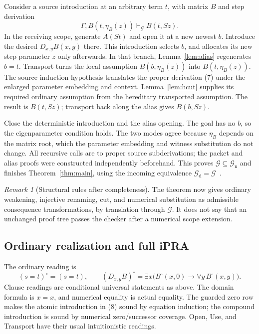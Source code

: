 \documentclass[11pt]{article}
\theoremstyle{definition}\newtheorem{definition}[theorem]{Definition}
\theoremstyle{remark}\newtheorem{remark}[theorem]{Remark}
\newcommand{\G}{\mathcal G}
\newcommand{\Gn}{\mathcal G_{\mathrm n}}
\newcommand{\Gd}{\mathcal G_{\mathrm d}}
\begin{document}
Consider a source introduction at an arbitrary term $t$, with matrix
$B$ and step derivation
\[
          \Gamma,B(t,\eta_B(z))\vdash_{\G}B(t,Sz).       \tag{7}
\]
In the receiving scope, generate $A(St)$ and open it at a new newest
$b$. Introduce the desired $D_{x,y}B(x,y)$ there. This introduction
selects $b$, and allocates its new step parameter $z$ only afterwards.
In that branch, Lemma~\ref{lem:alias} regenerates $b=t$. Transport
turns the local assumption $B(b,\eta_B(z))$ into
$B(t,\eta_B(z))$. The source induction hypothesis translates the
proper derivation (7) under the enlarged parameter embedding and
context. Lemma~\ref{lem:hcut} supplies its required ordinary assumption
from the hereditary transported assumption. The result is $B(t,Sz)$;
transport back along the alias gives $B(b,Sz)$.

Close the deterministic introduction and the alias opening. The goal
has no $b$, so the eigenparameter condition holds. The two modes agree
because $\eta_B$ depends on the matrix root, which the parameter
embedding and witness substitution do not change. All recursive calls
are to proper source subderivations; the packet and alias proofs were
constructed independently beforehand. This proves $\G\subseteq\Gn$
and finishes Theorem~\ref{thm:main}, using the incoming equivalence
$\Gd=\G$~\cite{deterministic}.

\begin{remark}[Structural rules after completeness]
The theorem now gives ordinary weakening, injective renaming, cut,
and numerical substitution as admissible consequence transformations,
by translation through $\G$. It does not say that an unchanged proof
tree passes the checker after a numerical scope extension.
\end{remark}

\subsection{Ordinary realization and full iPRA}

The ordinary reading is
\[
 (s=t)^\circ=(s=t),\qquad
 (D_{x,y}B)^\circ=
       \exists x\bigl(B^\circ(x,0)\to\forall y\,B^\circ(x,y)\bigr).
                                                               \tag{8}
\]
Clause readings are conditional universal statements as above. The
domain formula is $x=x$, and numerical equality is actual equality.
The guarded zero row makes the atomic introduction in (8) sound by
equation induction; the compound introduction is sound by numerical
zero/successor coverage. Open, Use, and Transport have their usual
intuitionistic readings.
\end{document}
